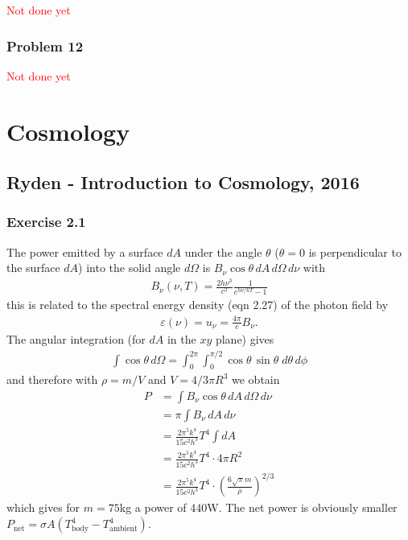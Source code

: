 \documentclass[10pt,a4paper]{book}
\theoremstyle{definition}
\begin{document}
\textcolor{red}{Not done yet}
\subsection{Problem 12}
\textcolor{red}{Not done yet}

\chapter{Cosmology}
\section{{\sc Ryden} - Introduction to Cosmology, 2016}
\subsection{Exercise 2.1}
The power emitted by a surface $dA$ under the angle $\theta$ ($\theta=0$ is perpendicular to the surface $dA$) into the solid angle $d\Omega$ is $B_\nu\cos\theta\,dA\,d\Omega\,d\nu$ with
\begin{align}
B_\nu(\nu,T)=\frac{2h\nu^3}{c^2}\frac{1}{e^{h\nu/kT}-1}
\end{align}
this is related to the spectral energy density (eqn 2.27) of the photon field by
\begin{align}
\varepsilon(\nu)=u_\nu=\frac{4\pi}{c}B_\nu.
\end{align}
The angular integration (for $dA$ in the $xy$ plane) gives
\begin{align}
\int\cos\theta\,d\Omega=\int_0^{2\pi}\int_0^{\pi/2}\cos\theta\,\sin\theta\;d\theta\,d\phi
\end{align}
and therefore with $\rho=m/V$ and $V=4/3\pi R^3$ we obtain
\begin{align}
P&=\int B_\nu\cos\theta\,dA\,d\Omega\,d\nu\\
&=\pi\int B_\nu\,dA\,d\nu\\
&=\frac{2\pi^5k^4}{15c^2h^3}T^4\int dA\\
&=\frac{2\pi^5k^4}{15c^2h^3}T^4\cdot 4\pi R^2\\
&=\frac{2\pi^5k^4}{15c^2h^3}T^4\cdot \left(\frac{6\sqrt{\pi}m}{\rho}\right)^{2/3}
\end{align}
which gives for $m=75$kg a power of 440W. The net power is obviously smaller $P_\text{net}=\sigma A(T_\text{body}^4-T_\text{ambient}^4)$. 
\end{document}
